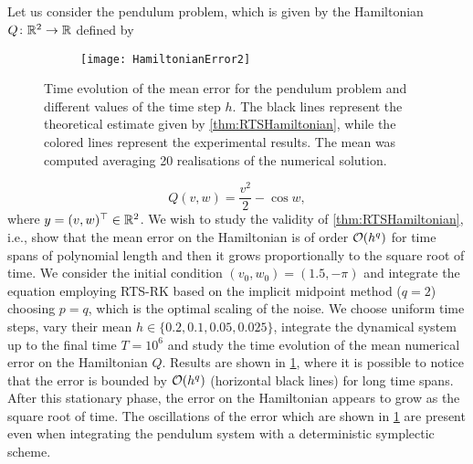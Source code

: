 \documentclass[10pt]{article}
\begin{document}
\subsection{} Let us consider the pendulum problem, which is given by the Hamiltonian $Q \colon \mathbb{R}^2 \to \mathbb{R}$ defined by

\begin{figure}[t]
	\begin{center}
	\begin{subfigure}{0.7\linewidth}
	\texttt{[image: HamiltonianError2]} 
	\end{subfigure}
	\begin{subfigure}{0.14\linewidth}
	\end{subfigure}
	\end{center}

	\caption{Time evolution of the mean error for the pendulum problem and different values of the time step $h$. The black lines represent the theoretical estimate given by \cref{thm:RTSHamiltonian}, while the colored lines represent the experimental results. The mean was computed averaging 20 realisations of the numerical solution.}
	\label{fig:MeanTime}	
\end{figure}
\begin{equation}
Q(v, w) = \frac{v^2}{2} - \cos w,
\end{equation}
where $y = (v, w)^\top \in \mathbb{R}^2$. We wish to study the validity of \cref{thm:RTSHamiltonian}, i.e., show that the mean error on the Hamiltonian is of order $\mathcal{O}(h^q)$ for time spans of polynomial length and then it grows proportionally to the square root of time. We consider the initial condition $(v_0, w_0) = (1.5, -\pi)$ and integrate the equation employing RTS-RK based on the implicit midpoint method ($q = 2$) choosing $p = q$, which is the optimal scaling of the noise. We choose uniform time steps, vary their mean $h \in \{0.2, 0.1, 0.05, 0.025\}$, integrate the dynamical system up to the final time $T = 10^6$ and study the time evolution of the mean numerical error on the Hamiltonian $Q$. Results are shown in \cref{fig:MeanTime}, where it is possible to notice that the error is bounded by $\mathcal{O}(h^q)$ (horizontal black lines) for long time spans. After this stationary phase, the error on the Hamiltonian appears to grow as the square root of time. The oscillations of the error which are shown in \cref{fig:MeanTime} are present even when integrating the pendulum system with a deterministic symplectic scheme. 
\end{document}
